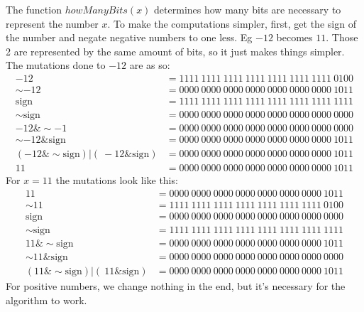 \documentclass[11pt]{report}
\begin{document}
The function $howManyBits(x)$ determines how many bits are necessary to represent the number $x$. To make the computations simpler, first, get the sign of the number and negate negative numbers to one less. Eg $-12$ becomes $11$. Those 2 are represented by the same amount of bits, so it just makes things simpler. The mutations done to $-12$ are as so:
\begin{align*}
    -12 &= 1111\ 1111\ 1111\ 1111\ 1111\ 1111\ 1111\ 0100\\
    \sim-12 &= 0000\ 0000\ 0000\ 0000\ 0000\ 0000\ 0000\ 1011\\
    \text{sign}  &= 1111\ 1111\ 1111\ 1111\ 1111\ 1111\ 1111\ 1111\\
    \sim\text{sign} &= 0000\ 0000\ 0000\ 0000\ 0000\ 0000\ 0000\ 0000\\
    -12 \& \sim-1 &= 0000\ 0000\ 0000\ 0000\ 0000\ 0000\ 0000\ 0000\\
    \sim-12 \& \text{sign} &= 0000\ 0000\ 0000\ 0000\ 0000\ 0000\ 0000\ 1011\\
    (-12 \& \sim\text{sign}) | (~-12 \& \text{sign}) &= 0000\ 0000\ 0000\ 0000\ 0000\ 0000\ 0000\ 1011\\
    11  &= 0000\ 0000\ 0000\ 0000\ 0000\ 0000\ 0000\ 1011
\end{align*}
For $x=11$ the mutations look like this:
\begin{align*}
    11 &= 0000\ 0000\ 0000\ 0000\ 0000\ 0000\ 0000\ 1011\\
    \sim11 &= 1111\ 1111\ 1111\ 1111\ 1111\ 1111\ 1111\ 0100\\
    \text{sign} &= 0000\ 0000\ 0000\ 0000\ 0000\ 0000\ 0000\ 0000\\
    \sim\text{sign} &= 1111\ 1111\ 1111\ 1111\ 1111\ 1111\ 1111\ 1111\\
    11 \& \sim\text{sign} &= 0000\ 0000\ 0000\ 0000\ 0000\ 0000\ 0000\ 1011\\
    \sim11 \& \text{sign} &= 0000\ 0000\ 0000\ 0000\ 0000\ 0000\ 0000\ 0000\\
    (11 \& \sim\text{sign}) | (~11 \& \text{sign}) &= 0000\ 0000\ 0000\ 0000\ 0000\ 0000\ 0000\ 1011
\end{align*}
For positive numbers, we change nothing in the end, but it's necessary for the algorithm to work.\\[1ex]
\end{document}
